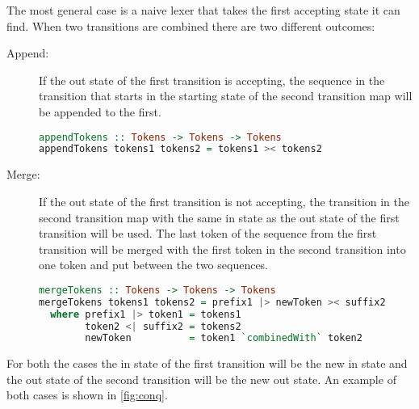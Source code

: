 The most general case is a naive lexer that takes the first accepting state it
can find. When two transitions are combined there are two different outcomes:
\begin{description} 
  \item[Append:]If the out state of the first transition is accepting, the
    sequence in the transition that starts in the starting state of the second
    transition map will be appended to the first.
\begin{lstlisting}[language=Haskell, mathescape=true]
appendTokens :: Tokens -> Tokens -> Tokens 
appendTokens tokens1 tokens2 = tokens1 >< tokens2
\end{lstlisting}

  \item[Merge:]If the out state of the first transition is not accepting, the
    transition in the second transition map with the same in state as the out
    state of the first transition will be used. The last token of the sequence
    from the first transition will be merged with the first token in the second
    transition into one token and put between the two sequences.\\

\begin{lstlisting}[language=Haskell, mathescape=true]
mergeTokens :: Tokens -> Tokens -> Tokens 
mergeTokens tokens1 tokens2 = prefix1 |> newToken >< suffix2
  where prefix1 |> token1 = tokens1
        token2 <| suffix2 = tokens2
        newToken          = token1 `combinedWith` token2
\end{lstlisting}

\end{description}
For both the cases the in state of the first transition will be the new in state
and the out state of the second transition will be the new out state. An example
of both cases is shown in \cref{fig:conq}.

